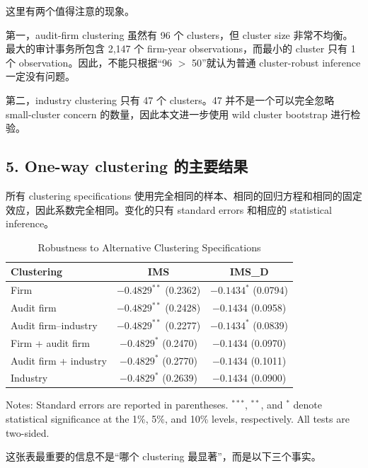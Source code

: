 \documentclass[11pt]{article}
\begin{document}
这里有两个值得注意的现象。

第一，audit-firm clustering 虽然有 96 个 clusters，但 cluster size 非常不均衡。最大的审计事务所包含 2,147 个 firm-year observations，而最小的 cluster 只有 1 个 observation。因此，不能只根据“96 $>$ 50”就认为普通 cluster-robust inference 一定没有问题。

第二，industry clustering 只有 47 个 clusters。47 并不是一个可以完全忽略 small-cluster concern 的数量，因此本文进一步使用 wild cluster bootstrap 进行检验。

\subsection{5. One-way clustering 的主要结果}

所有 clustering specifications 使用完全相同的样本、相同的回归方程和相同的固定效应，因此系数完全相同。变化的只有 standard errors 和相应的 statistical inference。

\begin{table}[htbp]
\centering
\caption{Robustness to Alternative Clustering Specifications}
\begin{tabular}{lcc}
\toprule
Clustering & IMS & IMS\_D \\
\midrule
Firm & $-0.4829^{**}$ (0.2362) & $-0.1434^{*}$ (0.0794) \\
Audit firm & $-0.4829^{**}$ (0.2428) & $-0.1434$ (0.0958) \\
Audit firm--industry & $-0.4829^{**}$ (0.2277) & $-0.1434^{*}$ (0.0839) \\
Firm + audit firm & $-0.4829^{*}$ (0.2470) & $-0.1434$ (0.0970) \\
Audit firm + industry & $-0.4829^{*}$ (0.2770) & $-0.1434$ (0.1011) \\
Industry & $-0.4829^{*}$ (0.2639) & $-0.1434$ (0.0900) \\
\bottomrule
\end{tabular}

\vspace{2mm}

\begin{flushleft}
\footnotesize
Notes: Standard errors are reported in parentheses. $^{***}$, $^{**}$, and $^{*}$ denote statistical significance at the 1\%, 5\%, and 10\% levels, respectively. All tests are two-sided.
\end{flushleft}
\end{table}

这张表最重要的信息不是“哪个 clustering 最显著”，而是以下三个事实。
\end{document}
